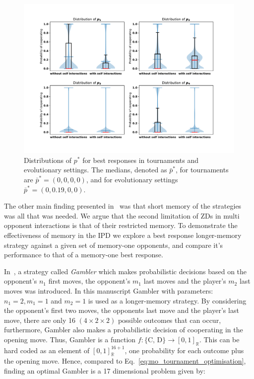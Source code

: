 \documentclass[10pt]{article}
\newcommand{\R}{\mathbb{R}}
\begin{document}
\begin{figure}[!htbp]
    \centering
    \includegraphics[width=.9\textwidth]{img/behaviour_violin_plots.pdf}
    \caption{Distributions of \(p^*\) for best responses in tournaments and
    evolutionary settings. The medians, denoted as \(\bar{p}^*\), for tournaments
    are \(\bar{p}^* = (0, 0, 0, 0)\), and for evolutionary settings
    \(\bar{p}^* = (0, 0.19, 0, 0)\).}
    \label{fig:behaviour_violin_plots}
\end{figure}

The other main finding presented in~\cite{Press20212} was that
short memory of the strategies was all that was needed.
We argue that the second limitation of ZDs in multi opponent
interactions is that of their restricted memory.
To demonstrate the effectiveness of memory in the IPD we explore a best response
longer-memory strategy against a given set of memory-one opponents,  and compare
it's performance to that of a memory-one best response.

In~\cite{Harper2017}, a strategy called \textit{Gambler} which makes
probabilistic decisions based on the opponent's \(n_1\) first moves, the
opponent's \(m_1\) last moves and the player's \(m_2\) last moves was
introduced. In this manuscript Gambler with parameters: $n_1 = 2, m_1 = 1$ and $m_2 = 1$ is used
as a longer-memory strategy.
By considering the opponent's first two moves, the opponents last move and the
player's last move, there are only 16 $(4 \times 2 \times 2)$ possible outcomes
that can occur, furthermore, Gambler also makes a probabilistic decision of
cooperating in the opening move. Thus, Gambler is a function \(f: \{\text{C,
D}\} \rightarrow [0, 1]_{\R}\). This can be hard coded as an element
of \([0, 1]_{\R} ^ {16 + 1}\), one probability for each outcome plus the opening
move. Hence, compared to Eq.~\ref{eq:mo_tournament_optimisation}, finding an
optimal Gambler is a 17 dimensional problem given by:
\end{document}
